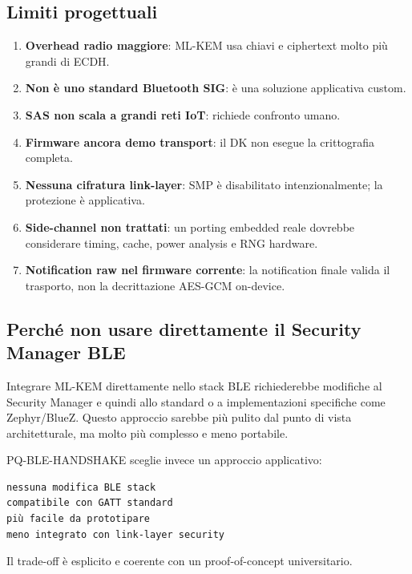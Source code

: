 \documentclass[11pt,a4paper]{article}
\providecommand{\tightlist}{\setlength{\itemsep}{0pt}\setlength{\parskip}{0pt}}
\begin{document}
\subsection{Limiti progettuali}\label{limiti-progettuali}

\begin{enumerate}
\def\labelenumi{\arabic{enumi}.}
\tightlist
\item
  \textbf{Overhead radio maggiore}: ML-KEM usa chiavi e ciphertext molto
  più grandi di ECDH.
\item
  \textbf{Non è uno standard Bluetooth SIG}: è una soluzione applicativa
  custom.
\item
  \textbf{SAS non scala a grandi reti IoT}: richiede confronto umano.
\item
  \textbf{Firmware ancora demo transport}: il DK non esegue la
  crittografia completa.
\item
  \textbf{Nessuna cifratura link-layer}: SMP è disabilitato
  intenzionalmente; la protezione è applicativa.
\item
  \textbf{Side-channel non trattati}: un porting embedded reale dovrebbe
  considerare timing, cache, power analysis e RNG hardware.
\item
  \textbf{Notification raw nel firmware corrente}: la notification
  finale valida il trasporto, non la decrittazione AES-GCM on-device.
\end{enumerate}

\subsection{Perché non usare direttamente il Security Manager
BLE}\label{perchuxe9-non-usare-direttamente-il-security-manager-ble}

Integrare ML-KEM direttamente nello stack BLE richiederebbe modifiche al
Security Manager e quindi allo standard o a implementazioni specifiche
come Zephyr/BlueZ. Questo approccio sarebbe più pulito dal punto di
vista architetturale, ma molto più complesso e meno portabile.

PQ-BLE-HANDSHAKE sceglie invece un approccio applicativo:

\begin{lstlisting}
nessuna modifica BLE stack
compatibile con GATT standard
più facile da prototipare
meno integrato con link-layer security
\end{lstlisting}

Il trade-off è esplicito e coerente con un proof-of-concept
universitario.
\end{document}
